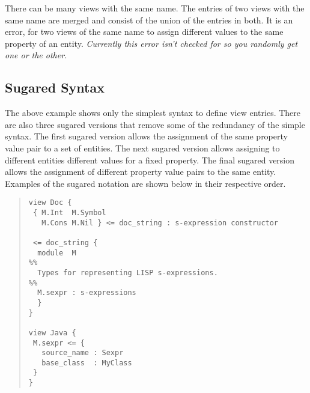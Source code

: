 There can be many views with the same name. The entries of two views
with the same name are merged and consist of the union of the entries
in both. It is an error, for two views of the same name to assign
different values to the same property of an entity. \emph{Currently
this error isn't checked for so you randomly get one or the other.}

\subsection{Sugared Syntax}
The above example shows only the simplest syntax to define view entries.
There are also three sugared versions that remove some of the redundancy of the simple
syntax. The first sugared version allows the assignment of the same
property value pair to a set of entities. The next sugared version allows
assigning to different entities different values for a fixed property.
The final sugared version allows the assignment of different property
value pairs to the same entity. Examples of the sugared notation are shown
below in their respective order.
\begin{quote}\begin{lstlisting}[language=ASDL]
view Doc {
 { M.Int  M.Symbol  
   M.Cons M.Nil } <= doc_string : s-expression constructor

 <= doc_string {
  module  M 
%%
  Types for representing LISP s-expressions.
%%
  M.sexpr : s-expressions 
  }
}

view Java {
 M.sexpr <= {
   source_name : Sexpr
   base_class  : MyClass
 }
}
\end{lstlisting}\end{quote}%
